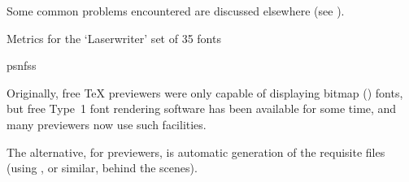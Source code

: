 Some common problems encountered are discussed elsewhere
(see ).
\begin{ctanrefs}
\item[Metrics for the `Laserwriter' set of 35 fonts]
\item[psnfss]
\end{ctanrefs}


Originally, free \TeX{} previewers were only capable of displaying
bitmap () fonts, but free Type~1 font rendering software has
been available for some time, and many previewers now use such
facilities.

The alternative, for previewers, is automatic generation of the
requisite  files (using , or similar,
behind the scenes).

